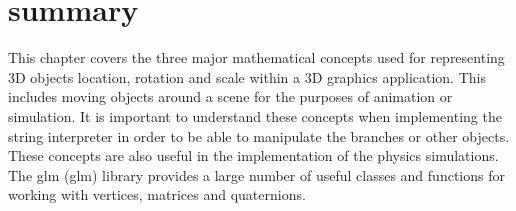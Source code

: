 \section{summary}

This chapter covers the three major mathematical concepts used for representing 3D objects location, rotation and scale within a 3D graphics application. This includes moving objects around a scene for the purposes of animation or simulation. It is important to understand these concepts when implementing the string interpreter in order to be able to manipulate the branches or other objects. These concepts are also useful in the implementation of the physics simulations. The \acrlong{glm} (\acrshort{glm}) library provides a large number of useful classes and functions for working with vertices, matrices and quaternions.






